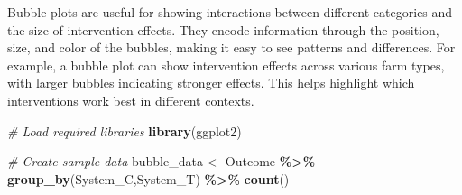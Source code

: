\documentclass[
]{book}
\newenvironment{Shaded}{\begin{snugshade}}{\end{snugshade}}
\newcommand{\CommentTok}[1]{\textcolor[rgb]{0.56,0.35,0.01}{\textit{#1}}}
\newcommand{\FunctionTok}[1]{\textcolor[rgb]{0.13,0.29,0.53}{\textbf{#1}}}
\newcommand{\NormalTok}[1]{#1}
\newcommand{\OtherTok}[1]{\textcolor[rgb]{0.56,0.35,0.01}{#1}}
\newcommand{\SpecialCharTok}[1]{\textcolor[rgb]{0.81,0.36,0.00}{\textbf{#1}}}
\begin{document}
Bubble plots are useful for showing interactions between different categories and the size of intervention effects.
They encode information through the position, size, and color of the bubbles, making it easy to see patterns and differences.
For example, a bubble plot can show intervention effects across various farm types, with larger bubbles indicating stronger effects.
This helps highlight which interventions work best in different contexts.

\begin{Shaded}
\begin{Highlighting}[]
\CommentTok{\# Load required libraries}
\FunctionTok{library}\NormalTok{(ggplot2)}

\CommentTok{\# Create sample data}
\NormalTok{bubble\_data }\OtherTok{\textless{}{-}}\NormalTok{ Outcome }\SpecialCharTok{\%\textgreater{}\%} 
  \FunctionTok{group\_by}\NormalTok{(System\_C,System\_T) }\SpecialCharTok{\%\textgreater{}\%} 
  \FunctionTok{count}\NormalTok{()}


\end{Highlighting}
\end{Shaded}
\end{document}
